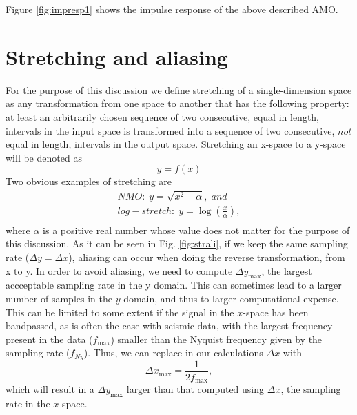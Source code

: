 Figure \ref{fig:impresp1} shows the impulse response of the above
described AMO.

\section{Stretching and aliasing}

For the purpose of this discussion we define stretching of a
single-dimension space as any transformation from one space to
another that has the following property: at least an arbitrarily chosen sequence
of two consecutive, equal in length, intervals in the input space is
transformed into a sequence of two consecutive, $not$ equal in length,
intervals in the output space. Stretching an x-space to a y-space will be denoted as 
\begin{equation}
\label{eqn:str}
y = f(x)
\end{equation}
Two obvious examples of stretching are
\[
\begin{array}{l}
 NMO:\;y = \sqrt {x^2  + \alpha } ,\;and \\ 
 log-stretch:\;y = \log \left( {\frac{x}{\alpha }} \right), \\ 
 \end{array}
\]
where $\alpha$ is a positive real number whose value does not matter
for the purpose of this discussion. As it can be seen in
Fig. \ref{fig:strali}, if we keep the same sampling rate ($\Delta y =
\Delta x$), aliasing can occur when doing the reverse transformation,
from x to y. In order to avoid aliasing, we need to compute $\Delta
y_{\max }$, the largest accceptable sampling rate in the y
domain. This can sometimes lead to a larger number of samples in the
$y$ domain, and thus to larger computational expense. This can be
limited to some extent if the signal in the $x$-space has been
bandpassed, as is often the case with seismic data, with the largest
frequency present in the data ($f_{\max}$) smaller than the Nyquist
frequency given by the sampling rate ($f_{Ny}$). Thus, we can replace in our calculations $\Delta x$ with
\[
\Delta x_{\max }  = \frac{1}{{2f_{\max } }},
\]
which will result in a $\Delta y_{\max }$ larger than that computed using $\Delta x$, the sampling rate in the $x$ space.


